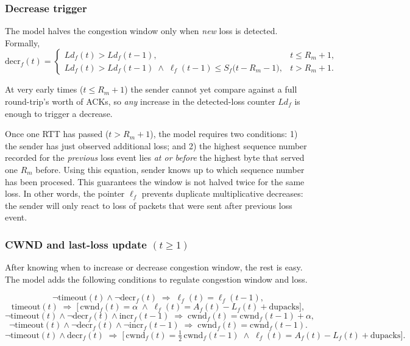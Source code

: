 \documentclass[12pt]{l4dc2023}
\begin{document}
\subsubsection{Decrease trigger}
The model halves the congestion window only when \emph{new} loss is detected. Formally,
\[
\mathrm{decr}_f(t)=
\begin{cases}
Ld_f(t) > Ld_f(t-1), & t \le R_m+1,\\[8pt]
Ld_f(t) > Ld_f(t-1)\;\land\;
\ell_f(t-1) \le S_f\bigl(t-R_m-1\bigr), & t > R_m+1.
\end{cases}
\]

At very early times (\(t\!\le\!R_m\!+\!1\)) the sender cannot yet compare against a full round-trip's worth of ACKs, so \emph{any} increase in the detected-loss counter \(Ld_f\) is enough to trigger a decrease.

Once one RTT has passed (\(t>R_m+1\)), the model requires two conditions: 1) the sender has just observed additional loss; and 2) the highest sequence number recorded for the \emph{previous} loss event lies \emph{at or before} the highest byte that served one $R_m$ before. Using this equation, sender knows up to which sequence number has been procesed. This guarantees the window is not halved twice for the same loss. In other words, the pointer \(\ell_f\) prevents duplicate multiplicative decreases: the sender will only react to loss of packets that were sent after previous loss event. 
 
\subsubsection{CWND and last-loss update \((t\ge1)\)}
After knowing when to increase or decrease congestion window, the rest is easy. The model adds the following conditions to regulate congestion window and loss. 

\[
\neg\mathrm{timeout}(t)\land\neg\mathrm{decr}_f(t)
\;\Longrightarrow\;
\ell_f(t)=\ell_f(t-1),
\]
\[
\mathrm{timeout}(t) \;\Longrightarrow\;
\bigl[\,
\mathrm{cwnd}_f(t)=\alpha
\;\land\;
\ell_f(t)=A_f(t)-L_f(t)+\mathrm{dupacks}\bigr],
\]
\[
\neg\mathrm{timeout}(t)\land\neg\mathrm{decr}_f(t)\land\mathrm{incr}_f(t-1)
\;\Longrightarrow\;
\mathrm{cwnd}_f(t)=\mathrm{cwnd}_f(t-1)+\alpha,
\]
\[
\neg\mathrm{timeout}(t)\land\neg\mathrm{decr}_f(t)\land\neg\mathrm{incr}_f(t-1)
\;\Longrightarrow\;
\mathrm{cwnd}_f(t)=\mathrm{cwnd}_f(t-1).
\]
\[
\neg\mathrm{timeout}(t)\land\mathrm{decr}_f(t)
\;\Longrightarrow\;
\bigl[\,
\mathrm{cwnd}_f(t)=\tfrac12\,\mathrm{cwnd}_f(t-1)
\;\land\;
\ell_f(t)=A_f(t)-L_f(t)+\mathrm{dupacks}\bigr].
\]
\end{document}
